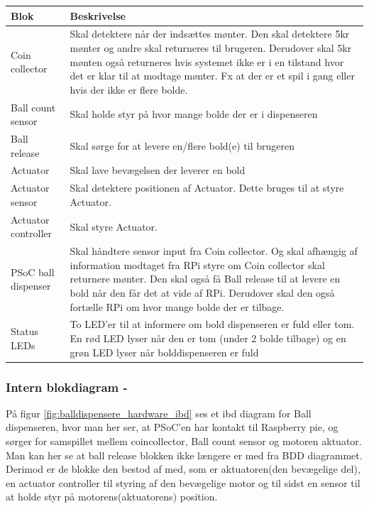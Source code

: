 \documentclass[Arkitektur/System_main.tex]{subfiles}
\begin{document}
\begin{table}[H]
\centering
\begin{tabular}{|L{0.2\columnwidth}|L{0.7\columnwidth}|}
\hline
\textbf{Blok} & \textbf{Beskrivelse} \\ \hline

Coin collector & Skal detektere når der indsættes mønter. Den skal detektere 5kr mønter og andre skal returneres til brugeren. Derudover skal 5kr mønten også returneres hvis systemet ikke er i en tilstand hvor det er klar til at modtage mønter. Fx at der er et spil i gang eller hvis der ikke er flere bolde.\\ \hline
Ball count sensor & Skal holde styr på hvor mange bolde der er i dispenseren\\ \hline
Ball release & Skal sørge for at levere en/flere bold(e) til brugeren\\ \hline
Actuator & Skal lave bevægelsen der leverer en bold \\ \hline
Actuator sensor & Skal detektere positionen af Actuator. Dette bruges til at styre Actuator.\\ \hline
Actuator controller & Skal styre Actuator.\\ \hline
PSoC ball dispenser & Skal håndtere sensor input fra Coin collector. Og skal afhængig af information modtaget fra RPi styre om Coin collector skal returnere mønter. Den skal også få Ball release til at levere en bold når den får det at vide af RPi. Derudover skal den også fortælle RPi om hvor mange bolde der er tilbage. \\ \hline
Status LEDs & To LED'er til at informere om bold dispenseren er fuld eller tom. En rød LED lyser når den er tom (under 2 bolde tilbage) og en grøn LED lyser når bolddispenseren er fuld\\ \hline
\end{tabular}
\end{table}

\subsubsection{Intern blokdiagram - }

På figur \ref{fig:balldispensere_hardware_ibd} ses et ibd diagram for Ball dispenseren, hvor man her ser, at PSoC'en har kontakt til Raspberry pie, og sørger for samspillet mellem coincollector, Ball count sensor og motoren aktuator. Man kan her se at ball release blokken ikke længere er med fra BDD diagrammet. Derimod er de blokke den bestod af med, som er aktuatoren(den bevægelige del), en actuator controller til styring af den bevægelige motor og til sidst en sensor til at holde styr på motorens(aktuatorens) position.
\end{document}
